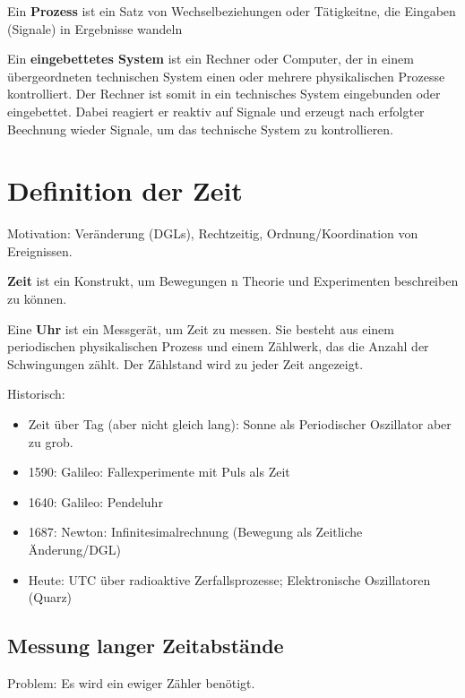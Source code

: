 \begin{tcolorbox}
Ein \textbf{Prozess} ist ein Satz von Wechselbeziehungen oder Tätigkeitne, die Eingaben
(\glqq{}Signale\grqq{}) in Ergebnisse wandeln
\end{tcolorbox}

\begin{tcolorbox}
Ein \textbf{eingebettetes System} ist ein Rechner oder Computer, der in einem 
übergeordneten technischen System einen oder mehrere physikalischen Prozesse kontrolliert.
Der Rechner ist somit in ein technisches System eingebunden oder eingebettet.
Dabei reagiert er reaktiv auf Signale und erzeugt nach erfolgter Beechnung wieder Signale,
um das technische System zu kontrollieren.
\end{tcolorbox}

\section{Definition der Zeit}
Motivation: Veränderung (DGLs), Rechtzeitig, Ordnung/Koordination von Ereignissen.

\begin{tcolorbox}
\textbf{Zeit} ist ein Konstrukt, um Bewegungen n Theorie und Experimenten beschreiben zu
können.
\end{tcolorbox}

\begin{tcolorbox}
Eine \textbf{Uhr} ist ein Messgerät, um Zeit zu messen. Sie besteht aus einem periodischen
physikalischen Prozess und einem Zählwerk, das die Anzahl der Schwingungen zählt. Der
Zählstand wird zu jeder Zeit angezeigt.
\end{tcolorbox}

Historisch:
\begin{itemize}
    \item Zeit über Tag (aber nicht gleich lang): Sonne als Periodischer Oszillator aber zu grob.
    \item 1590: Galileo: Fallexperimente mit Puls als Zeit
    \item 1640: Galileo: Pendeluhr
    \item 1687: Newton: Infinitesimalrechnung (Bewegung als Zeitliche Änderung/DGL)
    \item Heute: UTC über radioaktive Zerfallsprozesse; Elektronische Oszillatoren (Quarz)
\end{itemize}

\subsection{Messung langer Zeitabstände}
Problem: Es wird ein \glqq{}ewiger Zähler\grqq{} benötigt.


